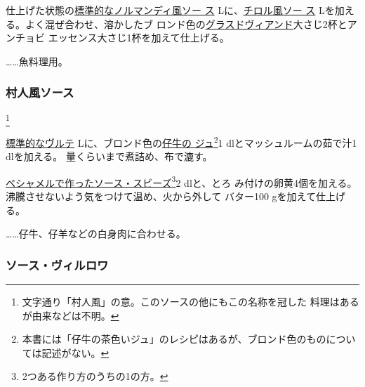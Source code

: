 \begin{recette}
 

仕上げた状態の\protect\hyperlink{sauce-normande}{標準的なノルマンディ風ソー
ス}\troisquarts{} Lに、\protect\hyperlink{sauce-tyrolienne}{チロル風ソー
ス}\unquart{} Lを加える。よく混ぜ合わせ、溶かしたブ
ロンド色の\protect\hyperlink{glace-de-viande}{グラスドヴィアンド}大さじ2杯とアンチョビ
エッセンス大さじ1杯を加えて仕上げる。

\ldots{}\ldots{}魚料理用。

\maeaki

\hypertarget{sauce-villageoise}{%
\subsubsection{村人風ソース}\label{sauce-villageoise}}

\footnote{文字通り「村人風」の意。このソースの他にもこの名称を冠した
  料理はあるが由来などは不明。}


\protect\hyperlink{veloute}{標準的なヴルテ}\troisquarts{}
Lに、ブロンド色の\protect\hyperlink{jus-de-veau-brun}{仔牛の
ジュ}\footnote{本書には「仔牛の茶色いジュ」のレシピはあるが、ブロンド色のものについては記述がない。}1
dlとマッシュルームの茹で汁1 dlを加える。
\deuxtiers{}量くらいまで煮詰め、布で漉す。

\protect\hyperlink{sauce-soubise}{ベシャメルで作ったソース・スビーズ}\footnote{2つある作り方のうちの1の方。}2
dlと、とろ
み付けの卵黄4個を加える。沸騰させないよう気をつけて温め、火から外して
バター100 gを加えて仕上げる。

\ldots{}\ldots{}仔牛、仔羊などの白身肉に合わせる。

\maeaki

\hypertarget{sauce-villeroy}{%
\subsubsection{ソース・ヴィルロワ}\label{sauce-villeroy}}


\end{recette}
